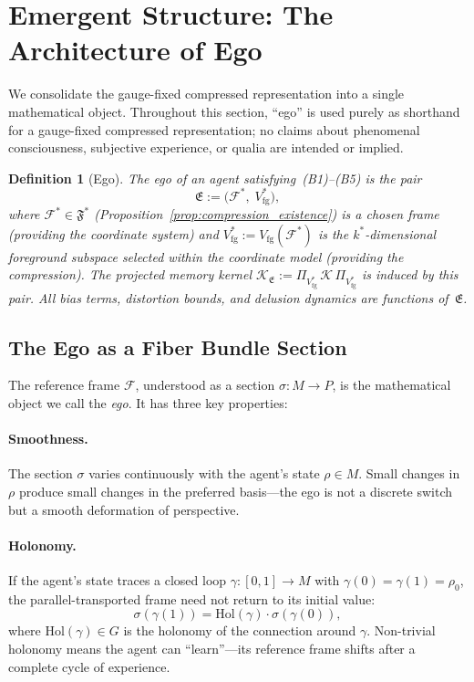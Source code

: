 \documentclass[12pt]{article}
\newtheorem{definition}[theorem]{Definition}
\begin{document}
\section{Emergent Structure: The Architecture of Ego}
\label{sec:architecture}

We consolidate the gauge-fixed compressed representation
into a single mathematical object.
Throughout this section, ``ego'' is used purely as shorthand
for a gauge-fixed compressed representation; no claims about
phenomenal consciousness, subjective experience, or qualia
are intended or implied.

\begin{definition}[Ego]
\label{def:ego}
The \emph{ego} of an agent satisfying~\textup{(B1)--(B5)}
is the pair
\begin{equation}
\label{eq:ego}
\mathfrak{E}
:= \bigl(\mathcal{F}^*,\;
   V_{\mathrm{fg}}^*\bigr),
\end{equation}
where $\mathcal{F}^* \in \mathfrak{F}^*$
(Proposition~\ref{prop:compression_existence}) is a chosen frame
(providing the coordinate system) and
$V_{\mathrm{fg}}^*
:= V_{\mathrm{fg}}(\mathcal{F}^*)$ is the
$k^*$-dimensional foreground subspace selected within the coordinate
model (providing the compression).
The projected memory kernel
$\mathcal{K}_{\mathfrak{E}}
:= \Pi_{V_{\mathrm{fg}}^*}\,\mathcal{K}\,
\Pi_{V_{\mathrm{fg}}^*}$
is induced by this pair.
All bias terms, distortion bounds, and delusion dynamics
are functions of~$\mathfrak{E}$.
\end{definition}

\subsection{The Ego as a Fiber Bundle Section}
\label{subsec:section}

The reference frame $\mathcal{F}$, understood as a section
$\sigma: M \to P$, is the mathematical object we call the
\emph{ego}.
It has three key properties:

\paragraph{Smoothness.}
The section $\sigma$ varies continuously with the agent's
state $\rho \in M$.
Small changes in $\rho$ produce small changes in the
preferred basis---the ego is not a discrete switch but a
smooth deformation of perspective.

\paragraph{Holonomy.}
If the agent's state traces a closed loop
$\gamma: [0,1] \to M$ with $\gamma(0) = \gamma(1) = \rho_0$,
the parallel-transported frame need not return to its
initial value:
\begin{equation}
\label{eq:holonomy}
\sigma(\gamma(1))
= \mathrm{Hol}(\gamma) \cdot \sigma(\gamma(0)),
\end{equation}
where $\mathrm{Hol}(\gamma) \in G$ is the holonomy of the
connection around $\gamma$.
Non-trivial holonomy means the agent can ``learn''---its
reference frame shifts after a complete cycle of experience.
\end{document}
